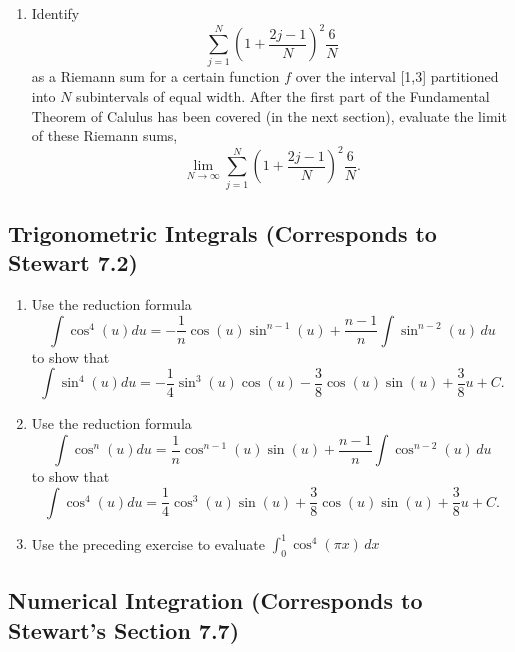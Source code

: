 \documentclass{article}
\begin{document}
\begin{enumerate}
    (ii) After the first part of the Fundamental Theorem of Calculus has been covered (in the next section), evaluate the given limit.

    \item Identify
    $$\sum_{j=1}^{N}\left(1+\frac{2j-1}{N}\right)^2\frac{6}{N}$$
    as a Riemann sum for a certain function $f$ over the interval [1,3] partitioned into $N$ subintervals of equal width. After the first part of the Fundamental Theorem of Calulus has been covered (in the next section), evaluate the limit of these Riemann sums,
    $$\lim_{N\to\infty}\sum_{j=1}^N\left(1+\frac{2j-1}{N}\right)^2\frac{6}{N}.$$

\end{enumerate} \vspace{2em}

\subsection*{Trigonometric Integrals (Corresponds to Stewart 7.2)} \vspace{2em}

\begin{enumerate}
    \item Use the reduction formula
    $$\int\cos^4(u)du=-\frac{1}{n}\cos(u)\sin^{n-1}(u)+\frac{n-1}{n}\int\sin^{n-2}(u)\,du$$
    to show that
    $$\int\sin^4(u)du=-\frac{1}{4}\sin^3(u)\cos(u)-\frac{3}{8}\cos(u)\sin(u)+\frac{3}{8}u+C.$$

    \item Use the reduction formula
    $$\int\cos^n(u)du=\frac{1}{n}\cos^{n-1}(u)\sin(u)+\frac{n-1}{n}\int\cos^{n-2}(u)\,du$$
    to show that
    $$\int\cos^4(u)du=\frac{1}{4}\cos^3(u)\sin(u)+\frac{3}{8}\cos(u)\sin(u)+\frac{3}{8}u+C.$$

    \item Use the preceding exercise to evaluate $\displaystyle \int_0^1\cos^4(\pi x)\,dx$
    
\end{enumerate} \vspace{2em}

\subsection*{Numerical Integration (Corresponds to Stewart's Section 7.7)} \vspace{2em}
\end{document}
